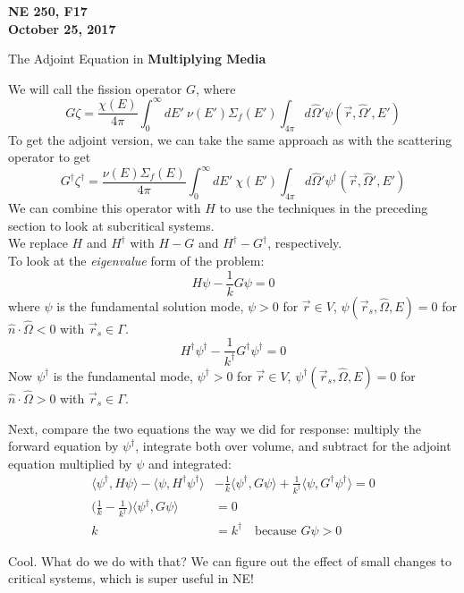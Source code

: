 \documentclass[12pt]{article}
\newcommand{\rvec}{\ensuremath{\vec{r}}}
\newcommand{\vOmega}{\ensuremath{\hat{\Omega}}}
\begin{document}
\begin{center}
{\bf NE 250, F17\\
October 25, 2017 
}
\end{center}

The Adjoint Equation in \textbf{Multiplying Media}

We will call the fission operator $G$, where
\[
G \zeta = \frac{\chi(E)}{4\pi}\int_0^{\infty} dE' \: \nu(E') \Sigma_f(E') \int_{4\pi} d\vOmega' \psi(\rvec, \vOmega', E')
\]
To get the adjoint version, we can take the same approach as with the scattering operator to get
\[
G^{\dagger} \zeta^{\dagger} = \frac{\nu(E) \Sigma_f(E)}{4\pi}\int_0^{\infty} dE' \: \chi(E') \int_{4\pi} d\vOmega' \psi^{\dagger}(\rvec, \vOmega', E')
\]
We can combine this operator with $H$ to use the techniques in the preceding section to look at subcritical systems.\\
We replace $H$ and $H^{\dagger}$ with $H-G$ and $H^{\dagger}-G^{\dagger}$, respectively.\\

To look at the \textit{eigenvalue} form of the problem:
\[
H\psi - \frac{1}{k}G\psi = 0
\]
where $\psi$ is the fundamental solution mode, $\psi > 0$ for $\rvec \in V$, $\psi(\vec{r}_s, \vOmega, E) = 0$ for $\hat{n} \cdot \vOmega < 0$ with $\vec{r}_s \in \Gamma$.  
\[
H^{\dagger}\psi^{\dagger} - \frac{1}{k^{\dagger}}G^{\dagger}\psi^{\dagger} = 0
\]
Now $\psi^{\dagger}$ is the fundamental mode, $\psi^{\dagger} > 0$ for $\rvec \in V$, $\psi^{\dagger}(\vec{r}_s, \vOmega, E) = 0$ for $\hat{n} \cdot \vOmega > 0$ with $\vec{r}_s \in \Gamma$.  

Next, compare the two equations the way we did for response: multiply the forward equation by $\psi^{\dagger}$, integrate both over volume, and subtract for the adjoint equation multiplied by $\psi$ and integrated:
\begin{align*}
\langle\psi^{\dagger}, H\psi\rangle - \langle\psi, H^{\dagger} \psi^{\dagger}\rangle &- \frac{1}{k}\langle\psi^{\dagger}, G\psi\rangle + \frac{1}{k^{\dagger}}\langle\psi, G^{\dagger}\psi^{\dagger}\rangle = 0\\
\bigl(\frac{1}{k} - \frac{1}{k^{\dagger}} \bigr)\langle\psi^{\dagger}, G\psi\rangle  &= 0 \\
k &= k^{\dagger} \quad \text{because }G\psi > 0
\end{align*}

Cool. What do we do with that? We can figure out the effect of small changes to critical systems, which is super useful in NE!
\end{document}

